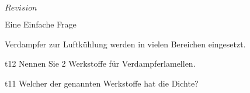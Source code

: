 \RCS $Revision$
\begin{aufgabe}{Eine Einfache Frage}
  \begin{textonly}
     Verdampfer zur Luftkühlung werden in vielen Bereichen eingesetzt.
  \end{textonly}
  \begin{teilaufgabe}{t}{1}{2}
      Nennen Sie 2 Werkstoffe für Verdampferlamellen.
  \end{teilaufgabe}
  \begin{loesung}
  \end{loesung}
  \begin{teilaufgabe}{t}{1}{1}
      Welcher der genannten  Werkstoffe hat die  Dichte?
  \end{teilaufgabe}
  \begin{loesung}
  \end{loesung}

\end{aufgabe}

